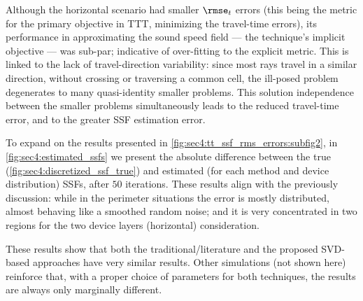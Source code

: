 Although the horizontal scenario had smaller $\rmse_{t}$ errors (this being the metric for the primary objective in TTT, minimizing the travel-time errors), its performance in approximating the sound speed field --- the technique's implicit objective --- was sub-par; indicative of over-fitting to the explicit metric. This is linked to the lack of travel-direction variability: since most rays travel in a similar direction, without crossing or traversing a common cell, the ill-posed problem degenerates to many quasi-identity smaller problems. This solution independence between the smaller problems simultaneously leads to the reduced travel-time error, and to the greater SSF estimation error.


To expand on the results presented in \cref{fig:sec4:tt_ssf_rms_errors:subfig2}, in \cref{fig:sec4:estimated_ssfs} we present the absolute difference between the true (\cref{fig:sec4:discretized_ssf_true}) and estimated (for each method and device distribution) SSFs, after $50$ iterations. These results align with the previously discussion: while in the perimeter situations the error is mostly distributed, almost behaving like a smoothed random noise; and it is very concentrated in two regions for the two device layers (horizontal) consideration.

These results show that both the traditional/literature and the proposed SVD-based approaches have very similar results. Other simulations (not shown here) reinforce that, with a proper choice of parameters for both techniques, the results are always only marginally different.

